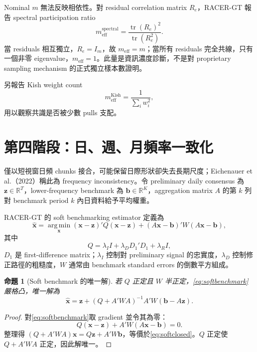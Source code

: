 \documentclass[12pt,a4paper,oneside]{article}
\newtheorem{proposition}{命題}[section]
\newcommand{\tr}{\operatorname{tr}}
\newcommand{\R}{\mathbb{R}}
\newcommand{\argmin}{\operatorname*{arg\,min}}
\begin{document}
Nominal $m$ 無法反映相依性。對 residual correlation matrix $R_e$，RACER-GT 報告 spectral participation ratio
\begin{equation}
m_{\mathrm{eff}}^{\mathrm{spectral}}
=\frac{\tr(R_e)^2}{\tr(R_e^2)}.
\label{eq:spectraleff}
\end{equation}
當 residuals 相互獨立，$R_e=I_m$，故 $m_{\mathrm{eff}}=m$；當所有 residuals 完全共線，只有一個非零 eigenvalue，$m_{\mathrm{eff}}=1$。此量是資訊濃度診斷，不是對 proprietary sampling mechanism 的正式獨立樣本數證明。

另報告 Kish weight count
\begin{equation}
m_{\mathrm{eff}}^{\mathrm{Kish}}=\frac{1}{\sum_i w_i^2},
\end{equation}
用以觀察共識是否被少數 pulls 支配。

\section{第四階段：日、週、月頻率一致化}

僅以短視窗日頻 chunks 接合，可能保留日際形狀卻失去長期尺度；Eichenauer et al.（2022）稱此為 frequency inconsistency。令 preliminary daily consensus 為 $\bm z\in\R^T$，lower-frequency benchmark 為 $\bm b\in\R^K$，aggregation matrix $A$ 的第 $k$ 列對 benchmark period $k$ 內日資料給予平均權重。

RACER-GT 的 soft benchmarking estimator 定義為
\begin{equation}
\widehat{\bm x}
=\argmin_{\bm x}
(\bm x-\bm z)'Q(\bm x-\bm z)
+(A\bm x-\bm b)'W(A\bm x-\bm b),
\label{eq:softbenchmark}
\end{equation}
其中
\begin{equation}
Q=\lambda_I I+\lambda_D D_1'D_1+\lambda_R I,
\end{equation}
$D_1$ 是 first-difference matrix；$\lambda_I$ 控制對 preliminary signal 的忠實度，$\lambda_D$ 控制修正路徑的粗糙度，$W$ 通常由 benchmark standard errors 的倒數平方組成。

\begin{proposition}[Soft benchmark 的唯一解]
若 $Q$ 正定且 $W$ 半正定，\cref{eq:softbenchmark}嚴格凸，唯一解為
\begin{equation}
\widehat{\bm x}
=\bm z+(Q+A'WA)^{-1}A'W(\bm b-A\bm z).
\label{eq:softclosed}
\end{equation}
\end{proposition}

\begin{proof}
對\cref{eq:softbenchmark}取 gradient 並令其為零：
\[
Q(\bm x-\bm z)+A'W(A\bm x-\bm b)=0.
\]
整理得 $(Q+A'WA)\bm x=Q\bm z+A'W\bm b$，等價於\cref{eq:softclosed}。$Q$ 正定使 $Q+A'WA$ 正定，因此解唯一。
\end{proof}
\end{document}
